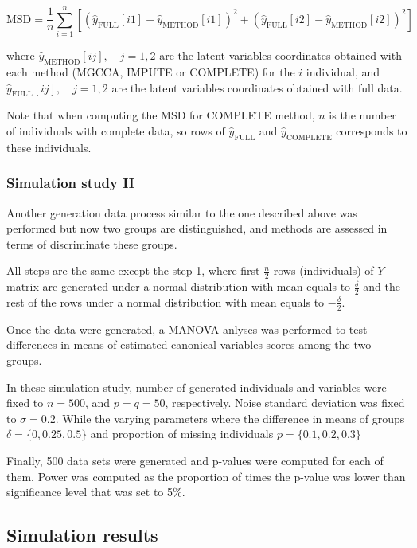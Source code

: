 \documentclass[article]{jss}
\begin{document}
$$\text{MSD} = \frac{1}{n}\sum_{i=1}^{n}\left[\left(\hat{y}_{\text{FULL}}[i1]-\hat{y}_{\text{METHOD}}[i1]\right)^2+\left(\hat{y}_{\text{FULL}}[i2]-\hat{y}_{\text{METHOD}}[i2]\right)^2\right]$$

where $\hat{y}_{\text{METHOD}}[ij],\quad j=1,2$ are the latent variables coordinates obtained with each method (MGCCA, IMPUTE or COMPLETE) for the $i$ individual, and $\hat{y}_{\text{FULL}}[ij],\quad j=1,2$ are the latent variables coordinates obtained with full data.

Note that when computing the MSD for COMPLETE method, $n$ is the number of individuals with complete data, so rows of $\hat{y}_{\text{FULL}}$ and $\hat{y}_{\text{COMPLETE}}$ corresponds to these individuals.

\subsubsection{Simulation study II}

Another generation data process similar to the one described above was performed but now two groups are distinguished, and methods are assessed in terms of discriminate these groups.

All steps are the same except the step 1, where first $\frac{n}{2}$ rows (individuals) of $Y$ matrix are generated under a normal distribution with mean equals to $\frac{\delta}{2}$ and the rest of the rows under a normal distribution with mean equals to $-\frac{\delta}{2}$.

Once the data were generated, a MANOVA anlyses was performed to test differences in means of estimated canonical variables scores among the two groups.

In these simulation study, number of generated individuals and variables were fixed to $n=500$, and $p=q=50$, respectively. Noise standard deviation was fixed to $\sigma=0.2$. 
While the varying parameters where the difference in means of groups $\delta=\{0, 0.25, 0.5\}$ and proportion of missing individuals $p=\{0.1, 0.2, 0.3\}$

Finally, 500 data sets were generated and p-values were computed for each of them. Power was computed as the proportion of times the p-value was lower than significance level that was set to 5\%.


\subsection{Simulation results}
\end{document}
